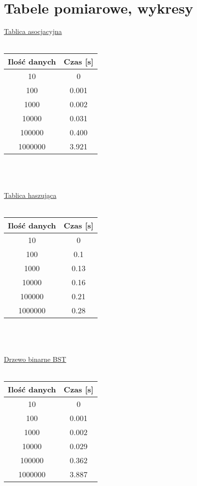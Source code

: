 \documentclass[11pt]{article}
\begin{document}
\section{Tabele pomiarowe, wykresy}
\underline{Tablica asocjacyjna} \\ \\
\begin{tabular}{|c|c|}
  \hline
  Ilość danych & Czas [s] \\
  \hline \hline
  10 & 0 \\ \hline
  100 & 0.001\\ \hline
  1000 & 0.002 \\ \hline
  10000 & 0.031 \\ \hline
  100000 & 0.400 \\ \hline
  1000000 & 3.921 \\ \hline
  
  \hline
  \end{tabular} 
\\ \\ \\
\underline{Tablica haszująca} \\ \\
\begin{tabular}{|c|c|} 
  \hline
  Ilość danych & Czas [s] \\
  \hline \hline
  10 & 0 \\ \hline
  100 & 0.1\\  \hline
  1000 & 0.13\\  \hline
  10000 & 0.16\\  \hline
  100000 & 0.21 \\ \hline
  1000000 & 0.28 \\ \hline
  \hline
  \end{tabular} 
 \\ \\ \\
\underline{Drzewo binarne BST} \\ \\
\begin{tabular}{|c|c|}
  \hline
  Ilość danych & Czas [s] \\
  \hline \hline
  10 & 0 \\ \hline
  100 & 0.001\\  \hline
  1000 & 0.002\\  \hline
  10000 & 0.029\\  \hline
  100000 & 0.362 \\ \hline
  1000000 & 3.887 \\ \hline
  \hline
  \end{tabular} 
\end{document}
